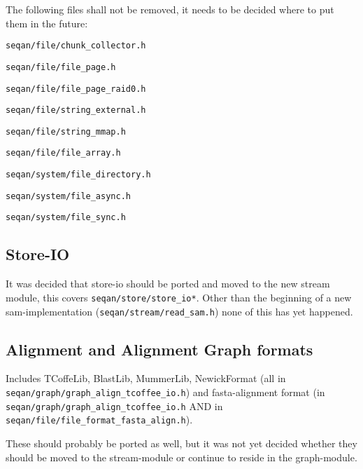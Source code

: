 \documentclass[a4paper,12pt]{scrartcl}
\newenvironment{packed_enum}{
\begin{enumerate}
  \setlength{\itemsep}{1pt}
  \setlength{\parskip}{0pt}
  \setlength{\parsep}{0pt}
}{\end{enumerate}}
\begin{document}
The following files shall not be removed, it needs to be decided where to put them in the future:

\begin{packed_enum}
\item \verb#seqan/file/chunk_collector.h#
\item \verb#seqan/file/file_page.h#
\item \verb#seqan/file/file_page_raid0.h#
\item \verb#seqan/file/string_external.h#
\item \verb#seqan/file/string_mmap.h#
\item \verb#seqan/file/file_array.h#
\item \verb#seqan/system/file_directory.h#
\item \verb#seqan/system/file_async.h#
\item \verb#seqan/system/file_sync.h#
\end{packed_enum}


\subsection{Store-IO}

It was decided that store-io should be ported and moved to the new stream module,
this covers \verb#seqan/store/store_io*#. Other than the beginning of a new 
sam-implementation (\verb#seqan/stream/read_sam.h#) none of this has yet 
happened.

\subsection{Alignment and Alignment Graph formats}

Includes TCoffeLib, BlastLib, MummerLib, NewickFormat (all in\\ 
\verb#seqan/graph/graph_align_tcoffee_io.h#) and fasta-alignment format 
(in\\ \verb#seqan/graph/graph_align_tcoffee_io.h# AND in 
\verb#seqan/file/file_format_fasta_align.h#).

These should probably be ported as well, but it was not yet decided whether 
they should be moved to the stream-module or continue to reside in the 
graph-module.
\end{document}
